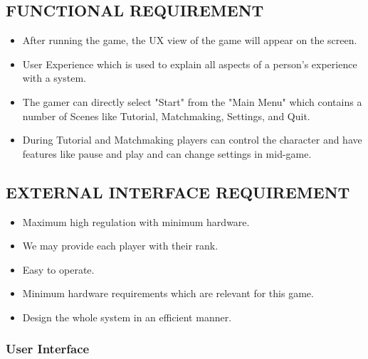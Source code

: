 \documentclass[12pt]{report}
\begin{document}

\centering
\raggedright
\subsection{FUNCTIONAL REQUIREMENT}

\justifying
\setlength{\parindent}{4em}
\setlength{\parskip}{0.5em}
\renewcommand{\baselinestretch}{1.5}

\begin{itemize}\item After running the game, the UX view of the game will appear on the screen.
\item User Experience which is used to explain all aspects of a person's experience with a system.
\item The gamer can directly select "Start" from the "Main Menu"  which contains a number of Scenes like Tutorial, Matchmaking, Settings, and Quit.
\item During Tutorial and Matchmaking players can control the character and have features like pause and play and can change settings in mid-game.

\end{itemize}
\centering
\raggedright
\subsection{EXTERNAL INTERFACE REQUIREMENT}

\justifying
\setlength{\parindent}{4em}
\setlength{\parskip}{0.5em}
\renewcommand{\baselinestretch}{1.5}
\normalsize\begin{itemize}\item  Maximum high regulation with minimum hardware.
\item We may provide each player with their rank.
\item Easy to operate.
\item Minimum hardware requirements which are relevant for this game.
\item Design the whole system in an efficient manner.
\end{itemize}
\subsubsection{User Interface}
\end{document}

